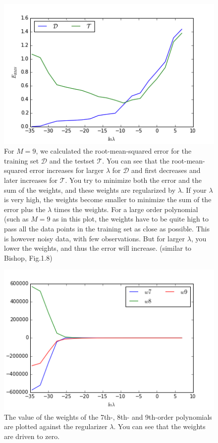 \documentclass[a4paper,11pt]{article}
\theoremstyle{mytheor}
\begin{document}
\begin{enumerate}
		\begin{figure}[h!]
			\centering
			\includegraphics[scale=0.8]{1_5.png}\vspace{-0.5cm}
			\caption{For $M = 9$, we calculated the root-mean-squared error for the training set $\mathcal{D}$ and the testset $\mathcal{T}$. You can see that the root-mean-squared error increases for larger $\lambda$ for $\mathcal{D}$ and first decreases and later increases for $\mathcal{T}$. You try to minimize both the error and the sum of the weights, and these weights are regularized by $\lambda$. If your $\lambda$ is very high, the weights become smaller to minimize the sum of the error plus the $\lambda$ times the weights. For a large order polynomial (such as $M = 9$ as in this plot, the weights have to be quite high to pass all the data points in the training set as close as possible. This is however noisy data, with few observations. But for larger $\lambda$, you lower the weights, and thus the error will increase. (similar to Bishop, Fig.1.8)}
		\end{figure}
		\begin{figure}[h!]
			\centering
			\includegraphics[scale=0.8]{1_5_2.png}\vspace{-0.5cm}
			\caption{The value of the weights of the 7th-, 8th- and 9th-order polynomials are plotted against the regularizer $\lambda$. You can see that the weights are driven to zero. }
		\end{figure}

\end{enumerate}
\end{document}
